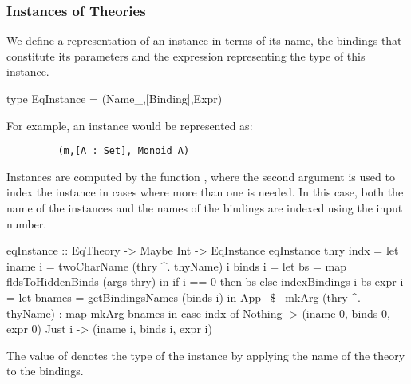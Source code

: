\begin{comment}
This is done using the function \lstmath{recordToEqTheory}. 
\begin{hscode}
recordToEqTheory :: TRecord -> Eq.EqTheory
recordToEqTheory record@(TRecord nm params _) =
  Eq.build (nm^.name) 
    (getRecordSort record)
    (getRecordComps isFunc record)
    (getRecordComps isAxiom record)
    (paramsNum params)
\end{hscode}
In Tog, records definitions are declared using the \lstmath{Record} constructor of the type \lstmath{Decl}, which contains many other constructors used to define functions, types, and others. We prefer to use a type dedicated to records, and therefore use the \lstmath{TRecord} type instead. \lstmath{TRecord} has the exact same parameters as the \lstmath{Record} constructor. 
\end{comment}

\subsubsection*{Instances of Theories}
\label{sec:instances_theories}
We define a representation of an instance in terms of its name, the bindings that constitute its parameters and the expression representing the type of this instance. 
\begin{hscode}
type EqInstance = (Name_,[Binding],Expr) 
\end{hscode}
\noindent For example, an instance  would be represented as: 
\begin{lstlisting} 
         (m,[A : Set], Monoid A)
\end{lstlisting} 

Instances are computed by the function , where the second argument is used to index the instance in cases where more than one is needed. In this case, both the name of the instances and the names of the bindings are indexed using the input number. 
\begin{hscode} 
eqInstance :: EqTheory -> Maybe Int -> EqInstance 
eqInstance thry indx =
  let iname i = twoCharName (thry ^. thyName) i 
      binds i =
        let bs = map fldsToHiddenBinds (args thry)
        in if i == 0 then bs else indexBindings i bs
      expr i =
        let bnames = getBindingsNames (binds i)
        in App ~$\$$~ mkArg (thry ^. thyName) : map mkArg bnames
   in case indx of
    Nothing -> (iname 0, binds 0, expr 0)
    Just i  -> (iname i, binds i, expr i)
\end{hscode}
\noindent The value of  denotes the type of the instance by applying the name of the theory to the bindings. 

